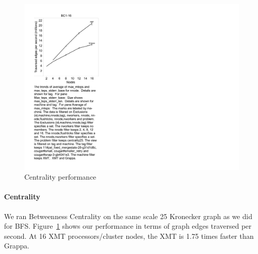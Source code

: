 \begin{figure}[tH]
\begin{center}
  \includegraphics[width=0.95\columnwidth]{figs/centrality_performance}
\begin{minipage}{0.95\columnwidth}
  \caption{\label{fig:centrality-performance} Centrality performance}
\end{minipage}
\vspace{-3ex}
\end{center}
\end{figure}

\paragraph{Centrality}

We ran Betweenness Centrality on the same scale 25 Kronecker graph as
we did for BFS. Figure~\ref{fig:centrality-performance} shows our
performance in terms of graph edges traversed per second. At 16 XMT
processors/cluster nodes, the XMT is 1.75 times faster than Grappa.




